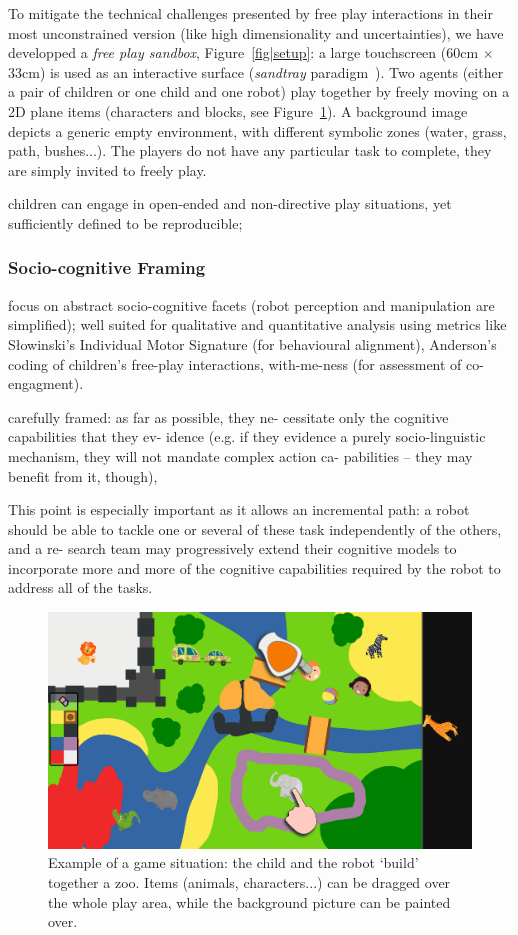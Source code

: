 \documentclass{article}
\begin{document}
To mitigate the technical challenges presented by free play interactions in
their most unconstrained version (like
high dimensionality and uncertainties), we have developped a \emph{free play
sandbox}, Figure~\ref{fig|setup}: a large touchscreen (60cm $\times$ 33cm) is
used as an interactive surface (\emph{sandtray}
paradigm~\cite{baxter2012touchscreen}). Two agents (either a pair of children or
one child and one robot) play together by freely moving on a 2D plane items
(characters and blocks, see Figure~\ref{fig|sandbox}). A background image
depicts a generic empty environment, with different symbolic zones (water,
grass, path, bushes...). The players do not have any particular task to
complete, they are simply invited to freely play.


children can engage in open-ended and
non-directive play situations, yet sufficiently
defined to be reproducible; 

\subsubsection{Socio-cognitive Framing}

focus on abstract socio-cognitive facets (robot
perception and manipulation are simplified); well suited for qualitative and
quantitative analysis using metrics like Słowinski’s Individual Motor Signature
(for behavioural alignment), Anderson's~\cite{anderson2004social} coding of children’s free-play
interactions, with-me-ness (for assessment of co-engagment).

carefully framed: as far as possible, they ne-
cessitate only the cognitive capabilities that they ev-
idence (e.g. if they evidence a purely socio-linguistic
mechanism, they will not mandate complex action ca-
pabilities – they may benefit from it, though),

This point is especially important as it allows an
incremental path: a robot should be able to tackle one or
several of these task independently of the others, and a re-
search team may progressively extend their cognitive models
to incorporate more and more of the cognitive capabilities
required by the robot to address all of the tasks.


\begin{figure}
    \centering
    \includegraphics[width=0.9\linewidth]{sandbox}
    \caption{Example of a game situation: the child and the robot `build'
    together a zoo. Items (animals, characters...) can be dragged over the whole
    play area, while the background picture can be painted over.}
    \label{fig|sandbox}
\end{figure}
\end{document}
